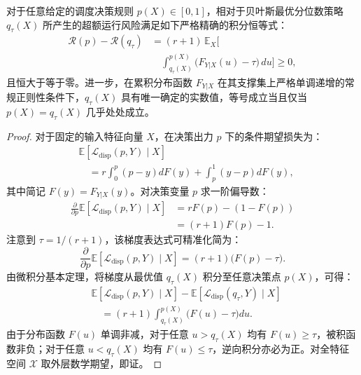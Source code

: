 \begin{proposition}[精确积分超额运行风险]
\label{prop:excess_risk}
对于任意给定的调度决策规则 $p(X) \in [0, 1]$，相对于贝叶斯最优分位数策略 $q_\tau(X)$ 所产生的超额运行风险满足如下严格精确的积分恒等式：
\begin{equation}
\begin{aligned}
\mathcal{R}(p) - \mathcal{R}(q_\tau) &= (r + 1) \, \mathbb{E}_X \Big[ \\
&\quad \int_{q_\tau(X)}^{p(X)} \big( F_{Y|X}(u) - \tau \big) \, du \Big] \ge 0,
\end{aligned}
\label{eq:exact_integral}
\end{equation}
且恒大于等于零。进一步，在累积分布函数 $F_{Y|X}$ 在其支撑集上严格单调递增的常规正则性条件下，$q_\tau(X)$ 具有唯一确定的实数值，等号成立当且仅当 $p(X) = q_\tau(X)$ 几乎处处成立。
\end{proposition}

\begin{proof}
对于固定的输入特征向量 $X$，在决策出力 $p$ 下的条件期望损失为：
\begin{equation}
\begin{aligned}
&\mathbb{E}[ \mathcal{L}_{\text{disp}}(p, Y) \mid X ] \\
&\quad = r \int_0^p (p - y) dF(y) + \int_p^1 (y - p) dF(y),
\end{aligned}
\end{equation}
其中简记 $F(y) = F_{Y|X}(y)$。对决策变量 $p$ 求一阶偏导数：
\begin{equation}
\begin{aligned}
\frac{\partial}{\partial p} \mathbb{E}[ \mathcal{L}_{\text{disp}}(p, Y) \mid X ] &= r F(p) - (1 - F(p)) \\
&= (r + 1) F(p) - 1.
\end{aligned}
\end{equation}
注意到 $\tau = 1 / (r+1)$，该梯度表达式可精准化简为：
\begin{equation}
\frac{\partial}{\partial p} \mathbb{E}[ \mathcal{L}_{\text{disp}}(p, Y) \mid X ] = (r + 1) \Big( F(p) - \tau \Big).
\end{equation}
由微积分基本定理，将梯度从最优值 $q_\tau(X)$ 积分至任意决策点 $p(X)$，可得：
\begin{equation}
\begin{aligned}
&\mathbb{E}[ \mathcal{L}_{\text{disp}}(p, Y) \mid X ] - \mathbb{E}[ \mathcal{L}_{\text{disp}}(q_\tau, Y) \mid X ] \\
&\quad = (r+1) \int_{q_\tau(X)}^{p(X)} \Big( F(u) - \tau \Big) du.
\end{aligned}
\end{equation}
由于分布函数 $F(u)$ 单调非减，对于任意 $u > q_\tau(X)$ 均有 $F(u) \ge \tau$，被积函数非负；对于任意 $u < q_\tau(X)$ 均有 $F(u) \le \tau$，逆向积分亦必为正。对全特征空间 $\mathcal{X}$ 取外层数学期望，即证。
\end{proof}

